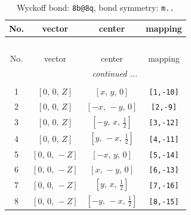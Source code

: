\documentclass[fleqn,8pt]{jsarticle}
\begin{document}
\begin{longtable}{cccc}
\caption{Wyckoff bond: {\tt 8b@8q}, bond symmetry: {\tt m..}}
 \\
 \hline \hline
No. & vector & center & mapping \\ \hline \endfirsthead

\multicolumn{3}{l}{\tablename\ \thetable{}} \\
 \hline \hline
No. & vector & center & mapping \\ \hline \endhead

 \hline \hline
\multicolumn{3}{r}{\footnotesize\it continued ...} \\ \endfoot

 \hline \hline
\multicolumn{3}{r}{} \\ \endlastfoot

1 & $\left[ 0,\, 0,\, Z \right]$ & $\left[ x,\, y,\, 0 \right]$ & {\tt [1,-10]} \\ \hline
2 & $\left[ 0,\, 0,\, Z \right]$ & $\left[ - x,\, - y,\, 0 \right]$ & {\tt [2,-9]} \\ \hline
3 & $\left[ 0,\, 0,\, Z \right]$ & $\left[ - y,\, x,\, \frac{1}{2} \right]$ & {\tt [3,-12]} \\ \hline
4 & $\left[ 0,\, 0,\, Z \right]$ & $\left[ y,\, - x,\, \frac{1}{2} \right]$ & {\tt [4,-11]} \\ \hline
5 & $\left[ 0,\, 0,\, - Z \right]$ & $\left[ - x,\, y,\, 0 \right]$ & {\tt [5,-14]} \\ \hline
6 & $\left[ 0,\, 0,\, - Z \right]$ & $\left[ x,\, - y,\, 0 \right]$ & {\tt [6,-13]} \\ \hline
7 & $\left[ 0,\, 0,\, - Z \right]$ & $\left[ y,\, x,\, \frac{1}{2} \right]$ & {\tt [7,-16]} \\ \hline
8 & $\left[ 0,\, 0,\, - Z \right]$ & $\left[ - y,\, - x,\, \frac{1}{2} \right]$ & {\tt [8,-15]} \\
\end{longtable}
\renewcommand{\arraystretch}{1.2}
\end{document}
